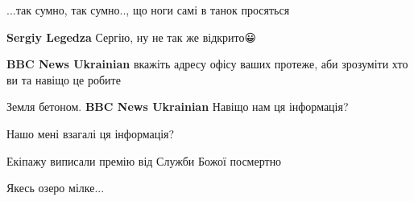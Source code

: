 \begin{itemize}
...так сумно, так сумно.., що ноги самі в танок просяться🤣

\begin{itemize}
 
\textbf{Sergiy Legedza} Сергію, ну не так же відкрито😀
\end{itemize}

 
\textbf{BBC News Ukrainian} вкажіть адресу офісу ваших протеже, аби зрозуміти хто ви та навіщо це робите

 
Земля бетоном. \textbf{BBC News Ukrainian} Навіщо нам ця інформація?

 
Нашо мені взагалі ця інформація?

 
Екіпажу виписали премію від Служби Божої посмертно

 
Якесь озеро мілке...


\end{itemize}
